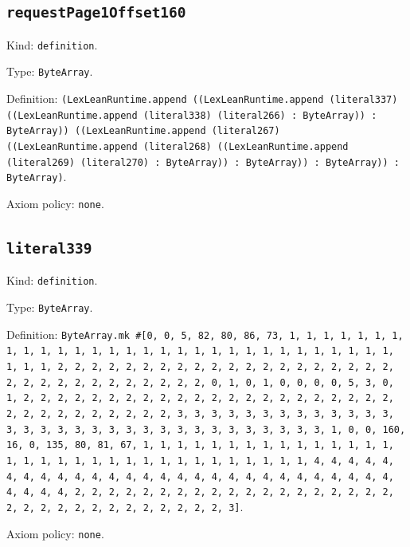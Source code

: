 \documentclass[11pt]{article}
\begin{document}
\subsection*{\texttt{requestPage1Offset160}}
\noindent Kind: \texttt{definition}.\par
\noindent Type: \texttt{ByteArray}.\par
\noindent Definition: \texttt{(LexLeanRuntime.append ((LexLeanRuntime.append (literal337) ((LexLeanRuntime.append (literal338) (literal266) : ByteArray)) : ByteArray)) ((LexLeanRuntime.append (literal267) ((LexLeanRuntime.append (literal268) ((LexLeanRuntime.append (literal269) (literal270) : ByteArray)) : ByteArray)) : ByteArray)) : ByteArray)}.\par
\noindent Axiom policy: \texttt{none}.\par
\subsection*{\texttt{literal339}}
\noindent Kind: \texttt{definition}.\par
\noindent Type: \texttt{ByteArray}.\par
\noindent Definition: \texttt{ByteArray.mk \#[0, 0, 5, 82, 80, 86, 73, 1, 1, 1, 1, 1, 1, 1, 1, 1, 1, 1, 1, 1, 1, 1, 1, 1, 1, 1, 1, 1, 1, 1, 1, 1, 1, 1, 1, 1, 1, 1, 1, 1, 2, 2, 2, 2, 2, 2, 2, 2, 2, 2, 2, 2, 2, 2, 2, 2, 2, 2, 2, 2, 2, 2, 2, 2, 2, 2, 2, 2, 2, 2, 2, 2, 0, 1, 0, 1, 0, 0, 0, 0, 5, 3, 0, 1, 2, 2, 2, 2, 2, 2, 2, 2, 2, 2, 2, 2, 2, 2, 2, 2, 2, 2, 2, 2, 2, 2, 2, 2, 2, 2, 2, 2, 2, 2, 2, 2, 3, 3, 3, 3, 3, 3, 3, 3, 3, 3, 3, 3, 3, 3, 3, 3, 3, 3, 3, 3, 3, 3, 3, 3, 3, 3, 3, 3, 3, 3, 3, 3, 1, 0, 0, 160, 16, 0, 135, 80, 81, 67, 1, 1, 1, 1, 1, 1, 1, 1, 1, 1, 1, 1, 1, 1, 1, 1, 1, 1, 1, 1, 1, 1, 1, 1, 1, 1, 1, 1, 1, 1, 1, 1, 1, 4, 4, 4, 4, 4, 4, 4, 4, 4, 4, 4, 4, 4, 4, 4, 4, 4, 4, 4, 4, 4, 4, 4, 4, 4, 4, 4, 4, 4, 4, 4, 4, 2, 2, 2, 2, 2, 2, 2, 2, 2, 2, 2, 2, 2, 2, 2, 2, 2, 2, 2, 2, 2, 2, 2, 2, 2, 2, 2, 2, 2, 2, 2, 2, 3]}.\par
\noindent Axiom policy: \texttt{none}.\par
\end{document}
